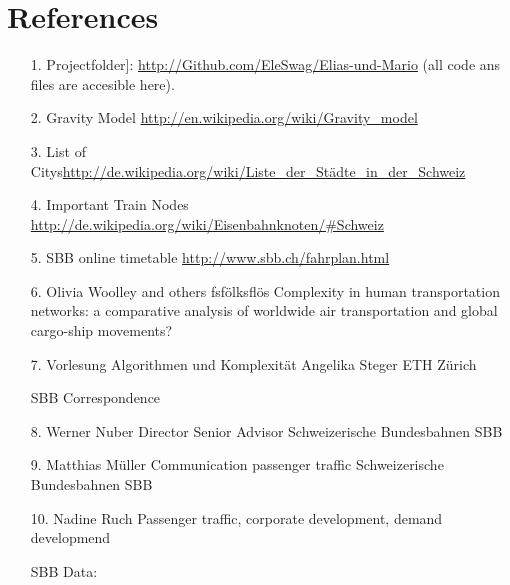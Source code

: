 \documentclass[11pt]{article}
\begin{document}
\section{References}
\begin{itemize}
\item[1.] Projectfolder]: \url{http://Github.com/EleSwag/Elias-und-Mario} (all code ans files are accesible here).\newline
\item[2.] Gravity Model \url{http://en.wikipedia.org/wiki/Gravity_model}\newline
\item[3.]List of Citys\url{http://de.wikipedia.org/wiki/Liste_der_Städte_in_der_Schweiz}\newline
\item[4.] Important Train Nodes \url{http://de.wikipedia.org/wiki/Eisenbahnknoten/\#Schweiz}\newline
\item[5.] SBB online timetable \url{http://www.sbb.ch/fahrplan.html}\newline

\item[6.] Olivia Woolley and others  fsfölksflös Complexity in human transportation networks: a comparative analysis of worldwide air transportation and global cargo-ship movements?\newline
\item[7.] Vorlesung Algorithmen und Komplexität Angelika Steger ETH Z\"urich\newline


SBB Correspondence\newline

\item[8.] Werner Nuber\newline
Director Senior Advisor\newline
Schweizerische Bundesbahnen SBB\newline
\item[9.] Matthias M\"uller\newline
Communication passenger traffic\newline
Schweizerische Bundesbahnen SBB\newline
\item[10.] Nadine Ruch\newline
Passenger traffic, corporate development,
demand developmend \newline

SBB Data:\newline


\end{itemize}
\end{document}
